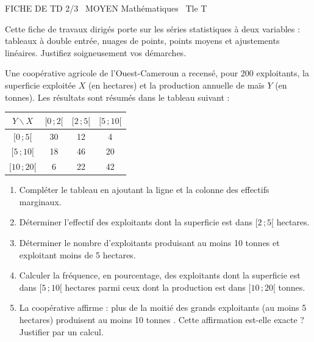 \documentclass[11pt]{article}
\begin{document}
\begin{tcolorbox}[enhanced,colback=popink,colframe=popink,arc=10pt,boxrule=0pt,left=12pt,right=12pt,top=9pt,bottom=9pt]
{\color{white}\popxbold\small FICHE DE TD 2/3 \textbullet\ MOYEN \hfill Mathématiques \textbullet\ Tle T\par}
\end{tcolorbox}
\vspace{4pt}
Cette fiche de travaux dirigés porte sur les séries statistiques à deux variables : tableaux à double entrée, nuages de points, points moyens et ajustements linéaires. Justifiez soigneusement vos démarches.

\begin{exercice}
Une coopérative agricole de l'Ouest-Cameroun a recensé, pour 200 exploitants, la superficie exploitée $X$ (en hectares) et la production annuelle de maïs $Y$ (en tonnes). Les résultats sont résumés dans le tableau suivant :

\begin{center}
\begin{tabular}{|c|c|c|c|}
\hline
$Y \backslash X$ & $[0\,;2[$ & $[2\,;5[$ & $[5\,;10[$ \\
\hline
$[0\,;5[$ & 30 & 12 & 4 \\
\hline
$[5\,;10[$ & 18 & 46 & 20 \\
\hline
$[10\,;20[$ & 6 & 22 & 42 \\
\hline
\end{tabular}
\end{center}

\begin{enumerate}
\item Compléter le tableau en ajoutant la ligne et la colonne des effectifs marginaux.
\item Déterminer l'effectif des exploitants dont la superficie est dans $[2\,;5[$ hectares.
\item Déterminer le nombre d'exploitants produisant au moins 10 tonnes et exploitant moins de 5 hectares.
\item Calculer la fréquence, en pourcentage, des exploitants dont la superficie est dans $[5\,;10[$ hectares parmi ceux dont la production est dans $[10\,;20[$ tonnes.
\item La coopérative affirme : \og plus de la moitié des grands exploitants (au moins 5 hectares) produisent au moins 10 tonnes \fg. Cette affirmation est-elle exacte ? Justifier par un calcul.
\end{enumerate}
\end{exercice}
\end{document}
